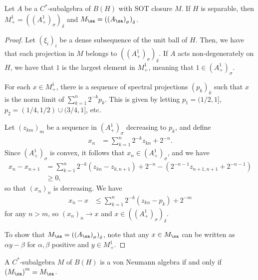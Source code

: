 \documentclass[10pt]{mypackage}
\begin{document}
\begin{theorem}
  Let $A$ be a $C^{\ast}$-subalgebra of $B(H)$ with SOT closure $M$. If $H$ is separable, then $M_{+}^{1} = \left( \left( A_{+}^1 \right)_{\sigma} \right)_{\delta}$ and $M_{\sa} = \left( \left( A_{\sa} \right)_{\sigma} \right)_{\delta}$.
\end{theorem}
\begin{proof}
  Let $\left( \xi_i \right)_i$ be a dense subsequence of the unit ball of $H$. Then, we have that each projection in $M$ belongs to $\left( \left( A_+^1 \right)_{\sigma} \right)_{\delta}$. If $A$ acts non-degenerately on $H$, we have that $1$ is the largest element in $M_+^1$, meaning that $1\in \left( A_+^1 \right)_{\sigma}$.

  For each $x\in M_+^1$, there is a sequence of spectral projections $\left( p_k \right)_k$ such that $x$ is the norm limit of $\sum_{k=1}^{n} 2^{-k}p_k$. This is given by letting $p_1 = (1/2,1]$, $p_2 = (1/4,1/2)\cup (3/4,1]$, etc.

  Let $\left( z_{km} \right)_{m}$ be a sequence in $\left( A_+^1 \right)_{\sigma}$ decreasing to $p_k$, and define
  \begin{align*}
    x_n &= \sum_{k=1}^{n} 2^{-k}z_{kn} + 2^{-n}.
  \end{align*}
  Since $\left( A_{+}^1 \right)_{\sigma}$ is convex, it follows that $x_n\in \left( A_+^1 \right)_{\sigma}$, and we have
  \begin{align*}
    x_n - x_{n+1} &= \sum_{k=1}^{n}2^{-k} \left( z_{kn} - z_{k,n+1} \right) + 2^{-n} - \left( 2^{-n-1}z_{n+1,n+1} + 2^{-n-1} \right)\\
                  &\geq 0,
  \end{align*}
  so that $\left( x_n \right)_n$ is decreasing. We have
  \begin{align*}
    x_n - x &\leq \sum_{k=1}^{n} 2^{-k} \left( z_{kn}-p_k \right) + 2^{-m}
  \end{align*}
  for any $n > m$, so $\left( x_n \right)_n\rightarrow x$ and $x\in \left( \left( A_+^1 \right)_{\sigma} \right)_{\delta}$.

  To show that $M_{\sa} = \left( \left( A_{\sa} \right)_{\sigma} \right)_{\delta}$, note that any $x\in M_{\sa}$ can be written as $\alpha y - \beta$ for $\alpha,\beta$ positive and $y\in M_{+}^{1}$.
\end{proof}
\begin{theorem}
  A $C^{\ast}$-subalgebra $M$ of $B(H)$ is a von Neumann algebra if and only if $\left( M_{\sa} \right)^m = M_{\sa}$.
\end{theorem}
\end{document}
